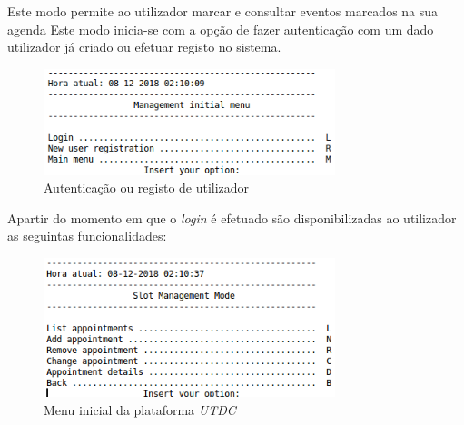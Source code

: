 \documentclass{article}
\begin{document}
Este modo permite ao utilizador marcar e consultar eventos marcados na sua agenda\newline
Este modo inicia-se com a opção de fazer autenticação com um dado utilizador já criado ou efetuar registo no sistema.\newline

\begin{figure}[H]
    \centering
    \includegraphics[width=8.5cm]{management_login.png}
    \caption{Autenticação ou registo de utilizador}
\end{figure}

Apartir do momento em que o \textit{login} é efetuado são disponibilizadas ao utilizador as seguintas funcionalidades:

\begin{figure}[H]
    \centering
    \includegraphics[width=8.5cm]{management.png}
    \caption{Menu inicial da plataforma \textit{UTDC}}
\end{figure}
\end{document}
